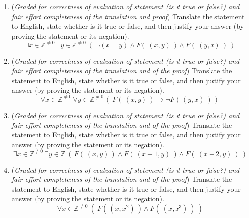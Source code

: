 \begin{enumerate}[labelindent=0pt, leftmargin=0pt]
\begin{enumerate}
    \begin{quote}
      To disprove the statement, we need to find a counterexample. We choose $2$, a nonzero
      integer so in the domain. We need to show that $\lnot F(~(2,1)~)$. By definition of the predicate $F$, we 
      can rewrite this goal as $1 \textbf{ mod } 2 \neq 0$. By definition of integer division, since 
      $1 = 0 \cdot 2  + 1$ (and $0 \leq 1 < 2$), $1 \textbf { mod } 2 = 1$ which is nonzero so the counterexample works to 
      disprove the original statement.
       $\square$
    \end{quote}
    
    {\it Hint: it may be useful to 
    identify the key words in the proof that indicate proof strategies.}
    
    \item ({\it Graded for correctness of evaluation of statement (is it true or false?) and fair effort completeness of the translation and proof}) 
    Translate the statement to English, state whether is it true or false, and then justify your answer (by proving the statement or its negation).
    $$\exists x \in \mathbb{Z}^{\neq 0}~ \exists y \in \mathbb{Z}^{\neq 0} ~(~\lnot(x = y) \land F(~(x,y)~) \land F(~(y,x)~)~)$$
    
    \item ({\it Graded for correctness of evaluation of statement (is it true or false?) 
    and fair effort completeness of the translation and of the proof}) 
    Translate the statement to English, state whether is it true or false, and then justify your answer (by proving the statement or its negation).
    $$\forall x \in \mathbb{Z}^{\neq 0}~ \forall y \in \mathbb{Z}^{\neq 0} ~(~F(~(x,y)~) \to \lnot F(~(y,x)~)~)$$
    
    \item ({\it Graded for correctness of evaluation of statement (is it true or false?) 
    and fair effort completeness of the translation and of the proof}) 
    Translate the statement to English, state whether is it true or false, and then justify your answer (by proving the statement or its negation).
    $$\exists x \in \mathbb{Z}^{\neq 0}~ \exists y \in \mathbb{Z}~(~F(~(x,y)~) \land  F(~(x+1, y)~) \land F(~(x+2, y)~)~)$$
    
    \item ({\it Graded for correctness of evaluation of statement (is it true or false?) 
    and fair effort completeness of the translation and of the proof}) 
    Translate the statement to English, state whether is it true or false, and then justify your answer (by proving the statement or its negation).
    $$\forall x \in \mathbb{Z}^{\neq 0}~ (~F(~(x,x^2)~) \land F(~(x,x^3)~)~)$$
    

\end{enumerate}
\end{enumerate}
